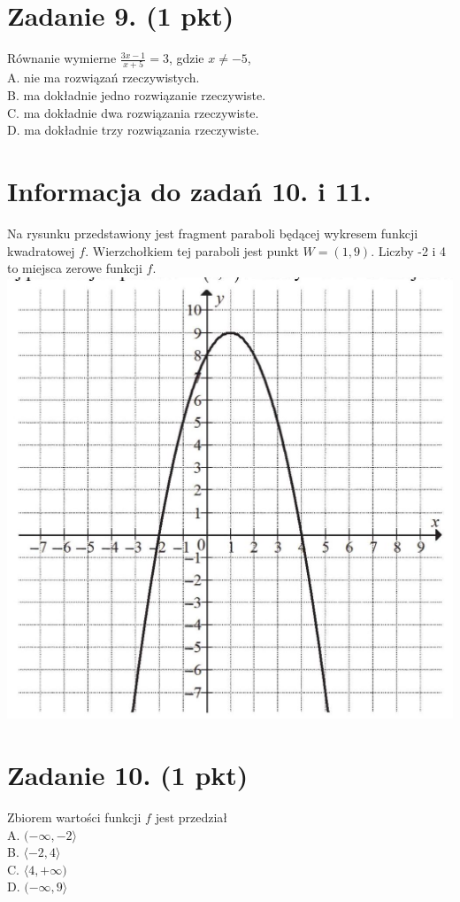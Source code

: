 \documentclass[10pt]{article}
\begin{document}
\section*{Zadanie 9. (1 pkt)}
Równanie wymierne \(\frac{3 x-1}{x+5}=3\), gdzie \(x \neq-5\),\\
A. nie ma rozwiązań rzeczywistych.\\
B. ma dokładnie jedno rozwiązanie rzeczywiste.\\
C. ma dokładnie dwa rozwiązania rzeczywiste.\\
D. ma dokładnie trzy rozwiązania rzeczywiste.

\section*{Informacja do zadań 10. i 11.}
Na rysunku przedstawiony jest fragment paraboli będącej wykresem funkcji kwadratowej \(f\). Wierzchołkiem tej paraboli jest punkt \(W=(1,9)\). Liczby -2 i 4 to miejsca zerowe funkcji \(f\).\\
\includegraphics[max width=\textwidth, center]{2024_11_21_779b7f825da3a12753feg-04}

\section*{Zadanie 10. (1 pkt)}
Zbiorem wartości funkcji \(f\) jest przedział\\
A. \((-\infty,-2\rangle\)\\
B. \(\langle-2,4\rangle\)\\
C. \(\langle 4,+\infty)\)\\
D. \((-\infty, 9\rangle\)
\end{document}
